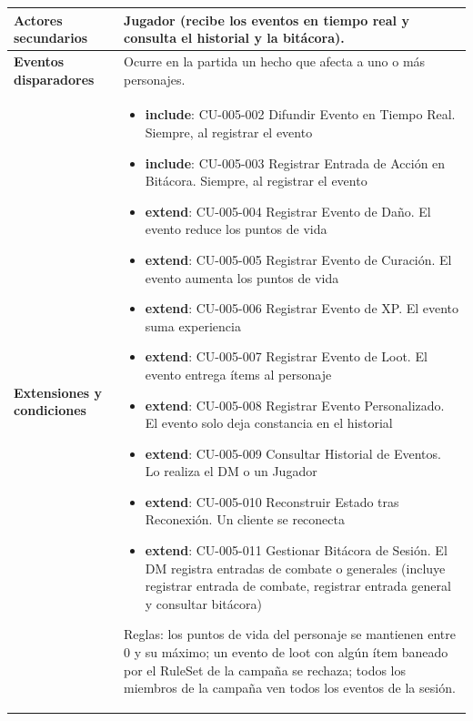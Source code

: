 {\begin{longtable}{|>{\raggedright\arraybackslash\bfseries}p{3.2cm}|>{\raggedright\arraybackslash}p{11.9cm}|}
Actores secundarios & Jugador (recibe los eventos en tiempo real y consulta el historial y la bitácora). \\ \hline
Eventos disparadores & Ocurre en la partida un hecho que afecta a uno o más personajes. \\ \hline
Extensiones y condiciones & \begin{itemize}[itemsep=2pt,topsep=2pt]
\item \textbf{include}: CU-005-002 Difundir Evento en Tiempo Real. Siempre, al registrar el evento
\item \textbf{include}: CU-005-003 Registrar Entrada de Acción en Bitácora. Siempre, al registrar el evento
\item \textbf{extend}: CU-005-004 Registrar Evento de Daño. El evento reduce los puntos de vida
\item \textbf{extend}: CU-005-005 Registrar Evento de Curación. El evento aumenta los puntos de vida
\item \textbf{extend}: CU-005-006 Registrar Evento de XP. El evento suma experiencia
\item \textbf{extend}: CU-005-007 Registrar Evento de Loot. El evento entrega ítems al personaje
\item \textbf{extend}: CU-005-008 Registrar Evento Personalizado. El evento solo deja constancia en el historial
\item \textbf{extend}: CU-005-009 Consultar Historial de Eventos. Lo realiza el DM o un Jugador
\item \textbf{extend}: CU-005-010 Reconstruir Estado tras Reconexión. Un cliente se reconecta
\item \textbf{extend}: CU-005-011 Gestionar Bitácora de Sesión. El DM registra entradas de combate o generales (incluye registrar entrada de combate, registrar entrada general y consultar bitácora)
\end{itemize}
Reglas: los puntos de vida del personaje se mantienen entre 0 y su máximo; un evento de loot con algún ítem baneado por el RuleSet de la campaña se rechaza; todos los miembros de la campaña ven todos los eventos de la sesión.


\end{longtable}}
